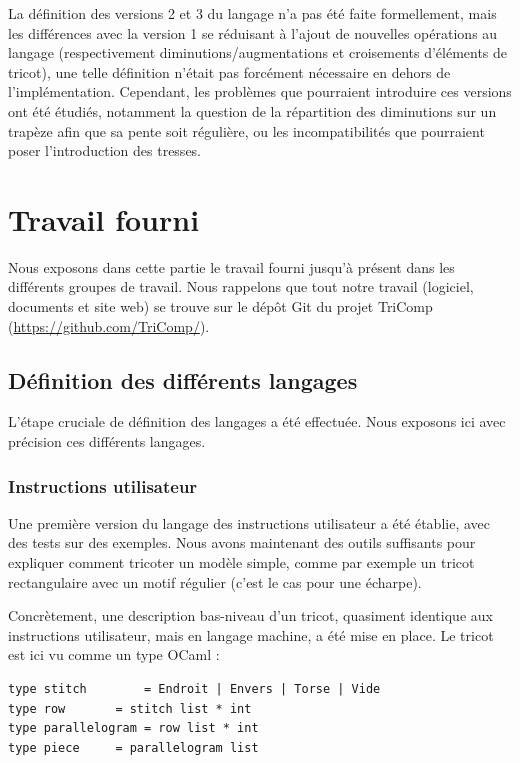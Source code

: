 \documentclass{article}
\begin{document}
La définition des versions 2 et 3 du langage n'a pas été faite formellement, mais les différences avec la version 1 se réduisant à l'ajout de 
nouvelles opérations au langage (respectivement diminutions/augmentations et croisements d'éléments de tricot), une telle définition n'était pas 
forcément nécessaire en dehors de l'implémentation. 
Cependant, les problèmes que pourraient introduire ces versions ont été étudiés, notamment la question de la répartition des diminutions sur un 
trapèze afin que sa pente soit régulière, ou les incompatibilités que pourraient poser l'introduction des tresses. 

\newpage

\section{Travail fourni}

Nous exposons dans cette partie le travail fourni jusqu'à présent dans les différents groupes de travail. Nous rappelons que tout notre travail (logiciel, documents et site web) se trouve sur le dépôt Git du projet TriComp (\url{https://github.com/TriComp/}).

\subsection{Définition des différents langages}

L'étape cruciale de définition des langages a été effectuée. Nous exposons ici avec précision ces différents langages.

\subsubsection{Instructions utilisateur}

Une première version du langage des instructions utilisateur a été établie, avec des tests sur des exemples. Nous avons maintenant des outils
suffisants pour expliquer comment tricoter un modèle simple, comme par exemple un tricot rectangulaire avec un motif régulier (c'est le cas pour une écharpe). 

Concrètement, une description bas-niveau d'un tricot, quasiment identique aux instructions utilisateur, mais en langage machine, a été mise en place.
Le tricot est ici vu comme un type OCaml :
\begin{lstlisting}
type stitch 	   = Endroit | Envers | Torse | Vide
type row 	   = stitch list * int
type parallelogram = row list * int
type piece 	   = parallelogram list
\end{lstlisting}
\end{document}
